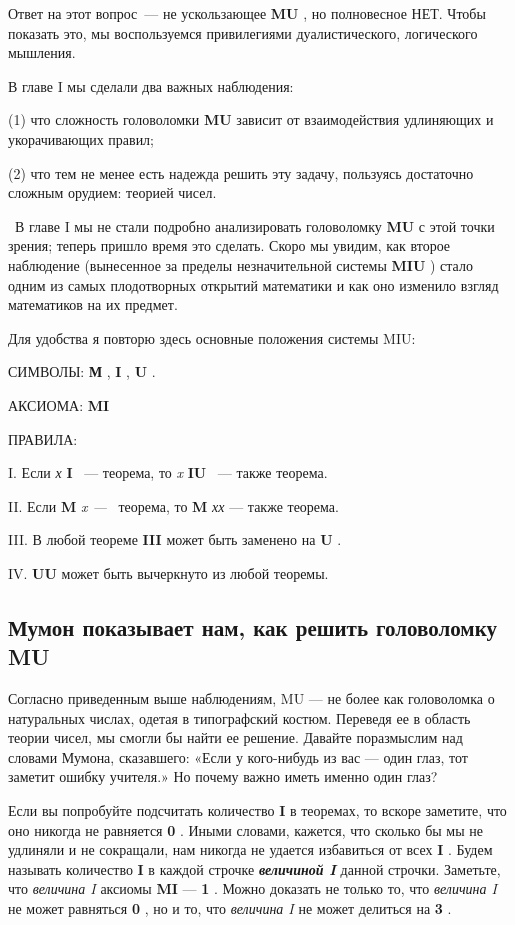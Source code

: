 \documentclass[../main.tex]{subfiles}
\begin{document}
Ответ на этот вопрос~--- не ускользающее \textbf{MU} , но полновесное НЕТ. Чтобы показать это, мы воспользуемся привилегиями дуалистического, логического мышления.

В главе I мы сделали два важных наблюдения:

(1) что сложность головоломки \textbf{MU} зависит от взаимодействия удлиняющих и укорачивающих правил;

(2) что тем не менее есть надежда решить эту задачу, пользуясь достаточно сложным орудием: теорией чисел.

~В главе I мы не стали подробно анализировать головоломку \textbf{MU} с этой точки зрения; теперь пришло время это сделать. Скоро мы увидим, как второе наблюдение (вынесенное за пределы незначительной системы \textbf{MIU} ) стало одним из самых плодотворных открытий математики и как оно изменило взгляд математиков на их предмет.

Для удобства я повторю здесь основные положения системы MIU:

СИМВОЛЫ: \textbf{М} , \textbf{I} , \textbf{U} .

АКСИОМА: \textbf{MI}

ПРАВИЛА:

I. Если \emph{х} \textbf{I} ~--- теорема, то \emph{x} \textbf{IU} ~--- также теорема.

II. Если \textbf{M} \emph{x ---} ~теорема, то \textbf{M} \emph{хх} --- также теорема.

III. В любой теореме \textbf{III} может быть заменено на \textbf{U} .

IV. \textbf{UU} может быть вычеркнуто из любой теоремы.


\subsection{Мумон показывает нам, как решить головоломку MU}

Согласно приведенным выше наблюдениям, MU --- не более как головоломка о натуральных числах, одетая в типографский костюм. Переведя ее в область теории чисел, мы смогли бы найти ее решение. Давайте поразмыслим над словами Мумона, сказавшего: «Если у кого-нибудь из вас --- один глаз, тот заметит ошибку учителя.» Но почему важно иметь именно один глаз?

Если вы попробуйте подсчитать количество \textbf{I} в теоремах, то вскоре заметите, что оно никогда не равняется \textbf{0} . Иными словами, кажется, что сколько бы мы не удлиняли и не сокращали, нам никогда не удается избавиться от всех \textbf{I} . Будем называть количество \textbf{I} в каждой строчке \emph{\textbf{величиной I}} данной строчки. Заметьте, что \emph{величина I} аксиомы \textbf{MI} --- \textbf{1} . Можно доказать не только то, что \emph{величина I} не может равняться \textbf{0} , но и то, что \emph{величина I} не может делиться на \textbf{3} .
\end{document}
